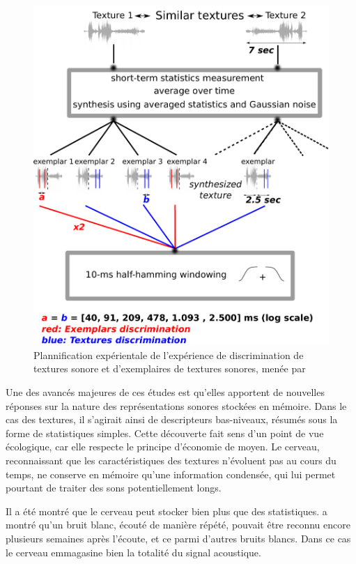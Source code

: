 \begin{figure}[bth]
        \myfloatalign
        \includegraphics[width=\linewidth]{gfx/mcder}
        \caption[Plannification expérientale de l'expérience de discrimination de textures sonore et d'exemplaires de textures sonores]{Plannification expérientale de l'expérience de discrimination de textures sonore et d'exemplaires de textures sonores, menée par \citep{mcdermott2013summary}}\label{fig:textureMcder}
\end{figure}

Une des avancés majeures de ces études est qu'elles apportent de nouvelles réponses sur la nature des représentations sonores stockées en mémoire. Dans le cas des textures, il s'agirait ainsi de descripteurs bas-niveaux, résumés sous la forme de statistiques simples. Cette découverte fait sens d'un point de vue écologique, car elle respecte le principe d'économie de moyen. Le cerveau, reconnaissant que les caractéristiques des textures n'évoluent pas au cours du temps, ne conserve en mémoire qu'une information condensée, qui lui permet pourtant de traiter des sons potentiellement longs. 

Il a été montré que le cerveau peut stocker bien plus que des statistiques.  \citep{agus2010rapid} a montré qu'un bruit blanc, écouté de manière répété, pouvait être reconnu encore plusieurs semaines après l'écoute, et ce parmi d'autres bruits blancs. Dans ce cas le cerveau emmagasine bien la totalité du signal acoustique.

